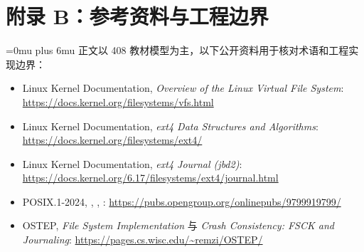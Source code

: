 \documentclass[11pt,a4paper]{ctexart}
\newcommand{\code}[1]{\texttt{\detokenize{#1}}}
\begin{document}
\section{附录 B：参考资料与工程边界}
\begingroup\Urlmuskip=0mu plus 6mu\relax
正文以 408 教材模型为主，以下公开资料用于核对术语和工程实现边界：
\begin{itemize}
  \item Linux Kernel Documentation, \emph{Overview of the Linux Virtual File System}: \url{https://docs.kernel.org/filesystems/vfs.html}
  \item Linux Kernel Documentation, \emph{ext4 Data Structures and Algorithms}: \url{https://docs.kernel.org/filesystems/ext4/}
  \item Linux Kernel Documentation, \emph{ext4 Journal (jbd2)}: \url{https://docs.kernel.org/6.17/filesystems/ext4/journal.html}
  \item POSIX.1-2024, \code{open()}, \code{dup()}, \code{fork()}: \url{https://pubs.opengroup.org/onlinepubs/9799919799/}
  \item OSTEP, \emph{File System Implementation} 与 \emph{Crash Consistency: FSCK and Journaling}: \url{https://pages.cs.wisc.edu/~remzi/OSTEP/}
\end{itemize}
\endgroup
\end{document}
